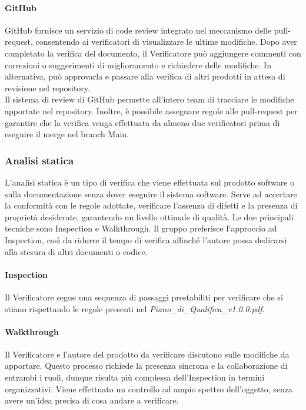\documentclass[10pt]{article}
\begin{document}
\begin{justify}
    \paragraph{GitHub}
    GitHub fornisce un servizio di code review integrato nel meccanismo delle pull-request, consentendo ai verificatori di visualizzare le ultime modifiche. Dopo aver completato la verifica del documento, il Verificatore può aggiungere commenti con correzioni o suggerimenti di miglioramento e richiedere delle modifiche. In alternativa, può approvarla e passare alla verifica di altri prodotti in attesa di revisione nel repository.\\
    Il sistema di review di GitHub permette all'intero team di tracciare le modifiche apportate nel repository. Inoltre, è possibile assegnare regole alle pull-request per garantire che la verifica venga effettuata da almeno due verificatori prima di eseguire il merge nel branch Main.

    \subsubsection{Analisi statica}
    L'analisi statica è un tipo di verifica che viene effettuata sul prodotto software o sulla documentazione senza dover eseguire il sistema software. Serve ad accertare la conformità con le regole adottate, verificare l'assenza di difetti e la presenza di proprietà desiderate, garantendo un livello ottimale di qualità. Le due principali tecniche sono Inspection e Walkthrough. Il gruppo preferisce l'approccio ad Inspection, così da ridurre il tempo di verifica affinché l'autore possa dedicarsi alla stesura di altri documenti o codice.
    
    \paragraph{Inspection}
    Il Verificatore segue una sequenza di passaggi prestabiliti per verificare che si stiano rispettando le regole presenti nel \textit{Piano\_di\_Qualifica\_v1.0.0.pdf}.
    
    \paragraph{Walkthrough}
    Il Verificatore e l'autore del prodotto da verificare discutono sulle modifiche da apportare. Questo processo richiede la presenza sincrona e la collaborazione di entrambi i ruoli, dunque risulta più complessa dell'Inspection in termini organizzativi. Viene effettuato un controllo ad ampio spettro dell'oggetto, senza avere un'idea precisa di cosa andare a verificare.


\end{justify}
\end{document}
